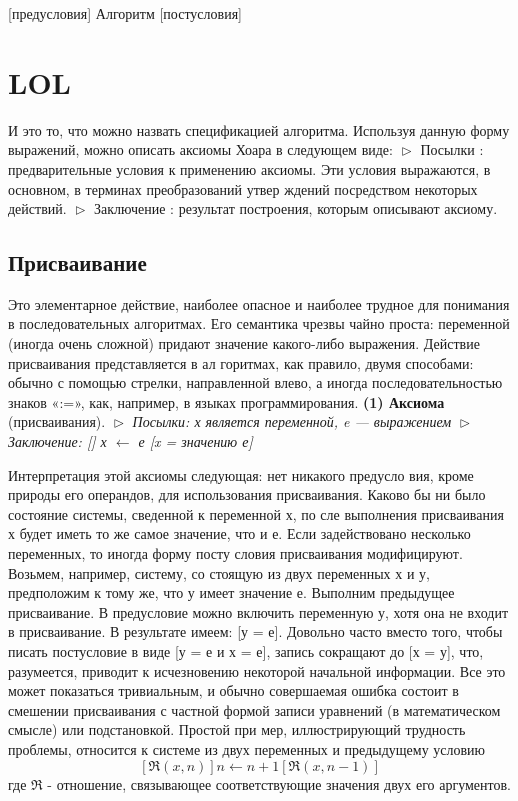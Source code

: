 \documentclass{mai_book}
\begin{document}
				      [предусловия] Алгоритм [постусловия]
\section{LOL}
И это то, что можно назвать спецификацией алгоритма. Используя 
данную форму выражений, можно описать аксиомы Хоара в следующем 
виде:
$\vartriangleright$ Посылки : предварительные условия к применению аксиомы. Эти 
условия  выражаются,  в  основном,  в  терминах  преобразований  утвер­
ждений посредством некоторых действий.
$\vartriangleright$ Заключение : результат построения, которым описывают аксиому.
\subsection{Присваивание}
Это элементарное  действие,  наиболее опасное  и  наиболее трудное  для 
понимания  в  последовательных  алгоритмах.  Его  семантика  чрезвы­
чайно  проста:  переменной  (иногда очень  сложной)  придают  значение 
какого-либо выражения.  Действие  присваивания  представляется  в  ал­
горитмах, как правило, двумя способами: обычно с помощью стрелки, 
направленной  влево,  а  иногда  последовательностью  знаков  «:=»,  как, 
например, в языках программирования.
\textbf{(1) Аксиома} (присваивания).
$\vartriangleright$ \textit{Посылки: х является переменной,  e  —  выражением}
$\vartriangleright$ \textit{Заключение: [] х $\leftarrow$ е [x = значению е]}
\pagebreak

\parindent=1cm Интерпретация  этой  аксиомы  следующая:  нет  никакого  предусло­
вия,  кроме  природы  его  операндов,  для  использования  присваивания. 
Каково  бы  ни  было состояние  системы,  сведенной  к  переменной х,  по­
сле выполнения присваивания х будет иметь то же самое значение,  что и е.
\parindent=1cm Если задействовано несколько переменных,  то иногда форму посту­
словия  присваивания  модифицируют.  Возьмем,  например,  систему,  со­
стоящую  из  двух  переменных х  и у,  предположим  к  тому  же,  что у
имеет значение  е.  Выполним предыдущее  присваивание. В предусловие 
можно включить  переменную у,  хотя она не  входит в присваивание.  В 
результате  имеем:  [у =   е].  Довольно часто  вместо  того,  чтобы писать 
постусловие  в  виде  [у =   е  и х  =   е],  запись  сокращают  до  [х  =   у], 
 что, разумеется,  приводит  к  исчезновению  некоторой  начальной  информа­ции.
\parindent=1cm Все  это  может  показаться  тривиальным,  и  обычно  совершаемая 
ошибка  состоит  в  смешении  присваивания с  частной  формой  записи 
уравнений (в математическом смысле)  или подстановкой. Простой при­
мер,  иллюстрирующий  трудность  проблемы,  относится  к  системе  из 
двух переменных  и  предыдущему  условию
\begin{equation}
\textit{$[\Re(x,n)] n \leftarrow n + 1 [\Re(x,n - 1)]$}
	\end{equation}
где $\Re$ - отношение,  связывающее соответствующие значения двух его 
аргументов.
\end{document}
